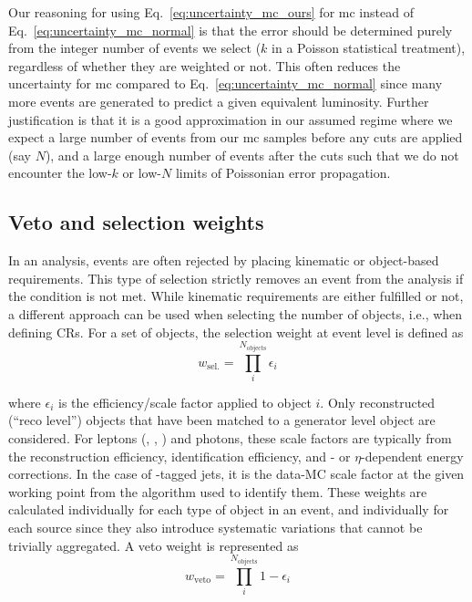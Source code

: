 Our reasoning for using Eq.~\ref{eq:uncertainty_mc_ours} for \acrshort{mc} instead of Eq.~\ref{eq:uncertainty_mc_normal} is that the error should be determined purely from the integer number of events we select ($k$ in a Poisson statistical treatment), regardless of whether they are weighted or not. This often reduces the uncertainty for \acrshort{mc} compared to Eq.~\ref{eq:uncertainty_mc_normal} since many more events are generated to predict a given equivalent luminosity. Further justification is that it is a good approximation in our assumed regime where we expect a large number of events from our \acrshort{mc} samples before any cuts are applied (say $N$), and a large enough number of events after the cuts such that we do not encounter the low-$k$ or low-$N$ limits of Poissonian error propagation.





\subsection{Veto and selection weights}
\label{subsec:veto_sel_weights}

In an analysis, events are often rejected by placing kinematic or object-based requirements. This type of selection strictly removes an event from the analysis if the condition is not met. While kinematic requirements are either fulfilled or not, a different approach can be used when selecting the number of objects, i.e., when defining \glspl{CR}. For a set of objects, the selection weight at event level is defined as
\begin{equation}
    w_{\mathrm{sel.}} = \prod_i^{N_\mathrm{objects}} \epsilon_i
    \label{eq:event_selection_weight}
\end{equation}

where $\epsilon_i$ is the efficiency/scale factor applied to object $i$. Only reconstructed (``reco level'') objects that have been matched to a generator level object are considered. For leptons (\Pe, \Pmu, \Ptau) and photons, these scale factors are typically from the reconstruction efficiency, identification efficiency, and \pt- or $\eta$-dependent energy corrections. In the case of \Pbottom-tagged \glspl{jet}, it is the data-MC scale factor at the given working point from the algorithm used to identify them. These weights are calculated individually for each type of object in an event, and individually for each source since they also introduce systematic variations that cannot be trivially aggregated. A veto weight is represented as
\begin{equation}
    w_{\mathrm{veto}} = \prod_i^{N_\mathrm{objects}} 1 - \epsilon_i
    \label{eq:event_veto_weight}
\end{equation}

